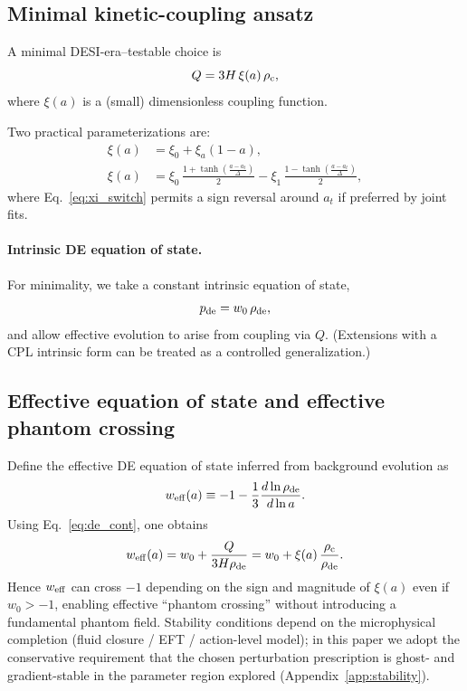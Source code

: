 \documentclass[11pt]{article}
\newcommand{\weff}{\ensuremath{w_{\rm eff}}\xspace}
\begin{document}
\subsection{Minimal kinetic-coupling ansatz}

A minimal DESI-era--testable choice is
\begin{equation}
Q = 3H\,\xi(a)\,\rho_{\rm c},
\label{eq:Q_def}
\end{equation}
where $\xi(a)$ is a (small) dimensionless coupling function.

Two practical parameterizations are:
\begin{align}
\xi(a) &= \xi_0 + \xi_a (1-a), \label{eq:xi_cpl}\\
\xi(a) &= \xi_0\,\frac{1+\tanh\!\left(\frac{a-a_t}{\Delta}\right)}{2}
        - \xi_1\,\frac{1-\tanh\!\left(\frac{a-a_t}{\Delta}\right)}{2},
\label{eq:xi_switch}
\end{align}
where Eq.~\eqref{eq:xi_switch} permits a sign reversal around $a_t$ if preferred by joint fits.

\paragraph{Intrinsic DE equation of state.}
For minimality, we take a constant intrinsic equation of state,
\begin{equation}
p_{\rm de} = w_0\,\rho_{\rm de},
\label{eq:w0}
\end{equation}
and allow effective evolution to arise from coupling via $Q$.
(Extensions with a CPL intrinsic form can be treated as a controlled generalization.)

\subsection{Effective equation of state and effective phantom crossing}

Define the effective DE equation of state inferred from background evolution as
\begin{equation}
\weff(a) \equiv -1 - \frac{1}{3}\frac{d\ln\rho_{\rm de}}{d\ln a}.
\label{eq:weff_def}
\end{equation}
Using Eq.~\eqref{eq:de_cont}, one obtains
\begin{equation}
\weff(a) = w_0 + \frac{Q}{3H\rho_{\rm de}}
         = w_0 + \xi(a)\,\frac{\rho_{\rm c}}{\rho_{\rm de}}.
\label{eq:weff_Q}
\end{equation}
Hence $\weff$ can cross $-1$ depending on the sign and magnitude of $\xi(a)$ even if $w_0>-1$,
enabling effective ``phantom crossing'' without introducing a fundamental phantom field.
Stability conditions depend on the microphysical completion (fluid closure / EFT / action-level model); in this paper we adopt the conservative requirement that the chosen perturbation prescription is ghost- and gradient-stable in the parameter region explored (Appendix~\ref{app:stability}).
\end{document}
